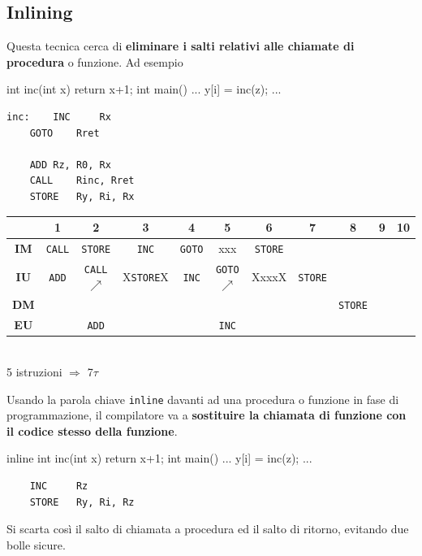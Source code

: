 \documentclass[10pt]{report}
\begin{document}
\subsection{Inlining}
Questa tecnica cerca di \textbf{eliminare i salti relativi alle chiamate di procedura} o funzione. Ad esempio
\begin{multicols}{2}
\begin{C}
int inc(int x) {return x+1;}
int main() {... y[i] = inc(z); ...}
\end{C}
\columnbreak
\begin{lstlisting}
inc:	INC 	Rx
	GOTO	Rret
	
	ADD	Rz, R0, Rx
	CALL	Rinc, Rret
	STORE	Ry, Ri, Rx
\end{lstlisting}
\end{multicols}
\begin{center}
\begin{tabular}{c|c|c|c|c|c|c|c|c|c|c|}
	 & 1 & 2 & 3 & 4 & 5 & 6 & 7 & 8 & 9 & 10 \\
	\hline
	\textbf{IM} & \texttt{CALL} & \texttt{STORE} & \texttt{INC} & \texttt{GOTO} & xxx & \texttt{STORE} & & & & \\
	\hline
	\textbf{IU} & \texttt{ADD} & \texttt{CALL}$\nearrow$ & X\texttt{STORE}X & \texttt{INC} & \texttt{GOTO}$\nearrow$ & XxxxX & \texttt{STORE} & & & \\
	\hline
	\textbf{DM} & & & & & & & & \texttt{STORE} & & \\
	\hline
	\textbf{EU} & & \texttt{ADD} & & & \texttt{INC} & & & & & \\
	\hline
\end{tabular}\\
5 istruzioni $\Rightarrow$ 7$\tau$
\end{center}
Usando la parola chiave \texttt{inline} davanti ad una procedura o funzione in fase di programmazione, il compilatore va a \textbf{sostituire la chiamata di funzione con il codice stesso della funzione}.
\begin{multicols}{2}
\begin{C}
inline int inc(int x) {return x+1;}
int main() {... y[i] = inc(z); ...}
\end{C}
\columnbreak
\begin{lstlisting}
	INC 	Rz
	STORE	Ry, Ri, Rz
\end{lstlisting}
\end{multicols}
Si scarta così il salto di chiamata a procedura ed il salto di ritorno, evitando due bolle sicure.
\end{document}
